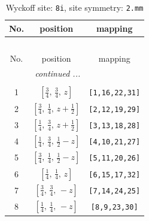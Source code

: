 \documentclass[fleqn,8pt]{jsarticle}
\begin{document}
\begin{longtable}{ccc}
\caption{Wyckoff site: {\tt 8i}, site symmetry: {\tt 2.mm}}
 \\
 \hline \hline
No. & position & mapping \\ \hline \endfirsthead

\multicolumn{2}{l}{\tablename\ \thetable{}} \\
 \hline \hline
No. & position & mapping \\ \hline \endhead

 \hline \hline
\multicolumn{2}{r}{\footnotesize\it continued ...} \\ \endfoot

 \hline \hline
\multicolumn{2}{r}{} \\ \endlastfoot

1 & $\left[ \frac{3}{4},\, \frac{3}{4},\, z \right]$ & {\tt [1,16,22,31]} \\ \hline
2 & $\left[ \frac{3}{4},\, \frac{1}{4},\, z + \frac{1}{2} \right]$ & {\tt [2,12,19,29]} \\ \hline
3 & $\left[ \frac{1}{4},\, \frac{3}{4},\, z + \frac{1}{2} \right]$ & {\tt [3,13,18,28]} \\ \hline
4 & $\left[ \frac{1}{4},\, \frac{3}{4},\, \frac{1}{2} - z \right]$ & {\tt [4,10,21,27]} \\ \hline
5 & $\left[ \frac{3}{4},\, \frac{1}{4},\, \frac{1}{2} - z \right]$ & {\tt [5,11,20,26]} \\ \hline
6 & $\left[ \frac{1}{4},\, \frac{1}{4},\, z \right]$ & {\tt [6,15,17,32]} \\ \hline
7 & $\left[ \frac{3}{4},\, \frac{3}{4},\, - z \right]$ & {\tt [7,14,24,25]} \\ \hline
8 & $\left[ \frac{1}{4},\, \frac{1}{4},\, - z \right]$ & {\tt [8,9,23,30]} \\
\end{longtable}
\renewcommand{\arraystretch}{1.2}
\end{document}
